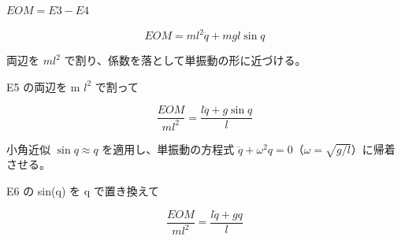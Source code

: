 \documentclass[dvipdfmx,a4paper,11pt]{jsarticle}
\begin{document}
$EOM = E3 - E4$

\begin{equation}
  EOM = m l^2 \ddot{q}+m g l \sin q
  \label{eq:E5}
\end{equation}

両辺を $ml^2$ で割り、係数を落として単振動の形に近づける。

E5 の両辺を m $l^2$ で割って

\begin{equation}
  \frac{EOM}{m l^2} = \frac{l \ddot{q}+g \sin q}{l}
  \label{eq:E6}
\end{equation}

小角近似 $\sin q\approx q$ を適用し、単振動の方程式 $\ddot q+\omega^2q=0$（$\omega=\sqrt{g/l}$）に帰着させる。

E6 の sin(q) を q で置き換えて

\begin{equation}
  \frac{EOM}{m l^2} = \frac{l \ddot{q}+g q}{l}
  \label{eq:E7}
\end{equation}
\end{document}
